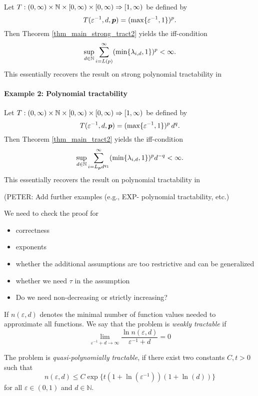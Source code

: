 \documentclass[11pt,a4paper]{article}
\newcommand{\fred}[1]{\begingroup\color{blue}#1\endgroup}
\newcommand{\peter}[1]{\begingroup\color{purple}#1\endgroup}
\begin{document}
Let $T: (0,\infty) \times \mathbb{N} \times [0,\infty) \times [0,\infty)\Rightarrow [1,\infty)$
be defined by
\[
 T(\varepsilon^{-1},d,\boldsymbol{p})= (\max\{\varepsilon^{-1},1\})^p .
\]
Then Theorem \ref{thm_main_strong_tract2} yields the iff-condition
\[
 \sup_{d\in\mathbb{N}} \sum_{i=L(p)}^\infty (\min\{\lambda_{i,d},1\})^p < \infty.
\]
This essentially recovers the result on strong polynomial tractability in \cite[Theorem 5.1]{NW08}

\paragraph{Example 2: Polynomial tractability}

Let $T: (0,\infty) \times \mathbb{N} \times [0,\infty) \times [0,\infty)\Rightarrow [1,\infty)$
be defined by
\[
 T(\varepsilon^{-1},d,\boldsymbol{p})= (\max\{\varepsilon^{-1},1\})^p\, d^q.
\]
Then Theorem \ref{thm_main_tract2} yields the iff-condition
\[
 \sup_{d\in\mathbb{N}} \sum_{i=L_{\boldsymbol{p}} d^{q_1}}^\infty (\min\{\lambda_{i,d},1\})^p d^{-q} < \infty.
\]
This essentially recovers the result on polynomial tractability in \cite[Theorem 5.1]{NW08}



\peter{(PETER: Add further examples (e.g., EXP- polynomial tractability, etc.)}

\bigskip

\fred{We need to check the proof for
\begin{itemize}
\item correctness
\item exponents
\item whether the additional assumptions are too restrictive and can be generalized
\item whether we need $\tau$ in the assumption
\item Do we need non-decreasing or strictly increasing?
\end{itemize}}
\begin{definition}
If $n(\varepsilon,d)$ denotes the minimal number of function values needed to approximate all functions. We say that the problem is \emph{weakly tractable} if
    \[\lim_{\varepsilon^{-1}+d\rightarrow \infty} \frac{\ln n(\varepsilon,d)}{\varepsilon^{-1}+d} = 0\]
\end{definition}
\begin{definition}
    The problem is \emph{quasi-polynomially tractable}, if there exist two constants $C, t> 0$ such that
    \[
    n(\varepsilon,d) \leq C\exp\{t(1+\ln(\varepsilon^{-1}))(1+\ln(d))\}
    \] for all $\varepsilon \in (0,1)$ and $d\in\mathbb{N}$.
\end{definition}
\end{document}
